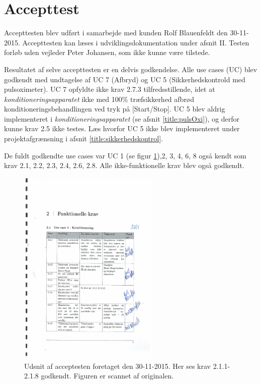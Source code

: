 \section{Accepttest} \label{title:accepttest1}
Accepttesten blev udført i samarbejde med kunden Rolf Blauenfeldt den 30-11-2015. Accepttesten kan læses i udviklingsdokumentation under afsnit II. Testen forløb uden vejleder Peter Johansen, som ikke kunne være tilstede.

Resultatet af selve accepttesten er en delvis godkendelse. Alle use cases (UC) blev godkendt med undtagelse af UC 7 (Afbryd) og UC 5 (Sikkerhedskontrold med pulsoximeter). UC 7 opfyldte ikke krav 2.7.3 tilfredsstillende, idet at \textit{konditioneringsapparatet} ikke med 100\% træfsikkerhed afbrød konditioneringsbehandlingen ved tryk på [Start/Stop]. UC 5 blev aldrig implementeret i \textit{konditioneringsapparatet} (se afsnit \ref{title:pulsOxi}), og derfor kunne krav 2.5 ikke testes. Læs hvorfor UC 5 ikke blev implementeret under projektafgrænsning i afsnit \ref{title:sikkerhedskontrol}.

De fuldt godkendte use cases var UC 1 (se figur \ref{fig:udsnitAfAccepttest}),2, 3, 4, 6, 8 også kendt som krav 2.1, 2.2, 2.3, 2.4, 2.6, 2.8. Alle ikke-funktionelle krav blev også godkendt. 

\begin{figure}[H]
	\centering
	\includegraphics[width=0.6\textwidth]{billeder/udsnitAfAccepttest.pdf}
	\caption{Udsnit af acceptesten foretaget den 30-11-2015. Her ses krav 2.1.1-2.1.8 godkendt. Figuren er scannet af originalen.}\label{fig:udsnitAfAccepttest}
\end{figure}

